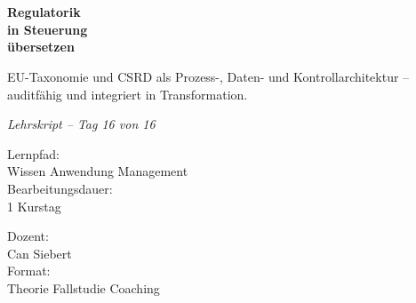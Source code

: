 \documentclass[11pt,a4paper,oneside]{article}
\newcommand{\caveatfontfallback}{\itshape}
\newcommand\caveatfont{\caveatfontfallback}%
\begin{document}
\begin{titlepage}
  \pagestyle{empty}
  \vspace*{1.5cm}
  \\[2pt]
  \noindent{\color{lpAccent}\rule{\linewidth}{1.2pt}}\\[4pt]

  \vspace{3cm}
  {\sffamily\fontsize{30}{34}\selectfont\bfseries\color{lpInk}Regulatorik\\in Steuerung\\übersetzen\par}

  \vspace{0.7cm}
  {\sffamily\large\color{lpGray}EU-Taxonomie und CSRD als Prozess-, Daten- und Kontrollarchitektur --\\auditfähig und integriert in Transformation.\par}

  \vspace{1.5cm}
  {\caveatfont\LARGE\color{lpAmber}Lehrskript -- Tag 16 von 16}\par

  \vfill

  \noindent\begin{minipage}{0.55\linewidth}
    {\sffamily\footnotesize\color{lpGray}Lernpfad:}\\
    {\sffamily\small\color{lpInk}Wissen \textrightarrow{} Anwendung \textrightarrow{} Management}\\[10pt]
    {\sffamily\footnotesize\color{lpGray}Bearbeitungsdauer:}\\
    {\sffamily\small\color{lpInk}1 Kurstag}
  \end{minipage}\hfill
  \begin{minipage}{0.4\linewidth}
    \raggedleft
    {\sffamily\footnotesize\color{lpGray}Dozent:}\\
    {\sffamily\small\color{lpInk}Can Siebert}\\[10pt]
    {\sffamily\footnotesize\color{lpGray}Format:}\\
    {\sffamily\small\color{lpInk}Theorie \textperiodcentered{} Fallstudie \textperiodcentered{} Coaching}
  \end{minipage}

  \vspace{0.5cm}
  \noindent{\color{lpAccent}\rule{\linewidth}{0.6pt}}
\end{titlepage}
\end{document}
